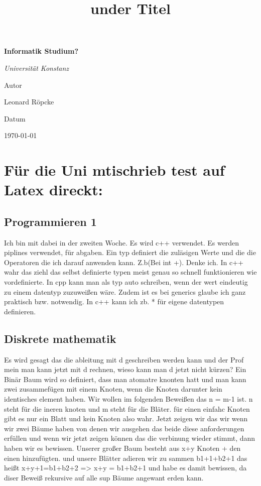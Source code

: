 \documentclass{article}
\title{under Titel}
\newcommand{\AuthorName}{Leonard Röpcke}
\newcommand{\Institute}{}
\newcommand{\header}{Informatik Studium?}
\newcommand{\Subtitle}{Universität Konstanz}
\newcommand{\MyDate}{\today}
\begin{document}
\begin{titlepage}
  \centering
  {\scshape\LARGE \Institute \par}
  \vspace{2.5cm}
  {\huge\bfseries \header \par}
  \vspace{0.8cm}
  {\Large\itshape \Subtitle \par}
  \vfill
  {\Large Autor\par}
  {\Large \AuthorName \par}
  \vspace{1cm}
  {\Large Datum\par}
  {\Large \MyDate \par}
  \vfill
  \vspace{1cm}
  {\small }
\end{titlepage}
\section*{Für die Uni mtischrieb test auf Latex direckt:}
\subsection{Programmieren 1}
Ich bin mit dabei in der zweiten Woche. Es wird c++ verwendet. Es werden piplines verwendet, für abgaben.
Ein typ definiert die zuläsigen Werte und die die Operatoren die ich darauf anwenden kann. Z.b(Bei int +). Denke ich.
In c++ wahr das ziehl das selbst definierte typen meist genau so schnell funktionieren wie vordefinierte.
In cpp kann man als typ auto schreiben, wenn der wert eindeutig zu einem datentyp zuzuweißen wäre. Zudem ist es bei 
generics glaube ich ganz praktisch bzw. notwendig. In c++ kann ich zb. * für eigene datentypen definieren.
\subsection{Diskrete mathematik}
Es wird gesagt das die ableitung mit d geschreiben werden kann und der Prof mein man kann jetzt mit d rechnen, wieso kann man d jetzt nicht kürzen?
Ein Binär Baum wird so definiert, dass man atomatre knonten hatt und man kann zwei zusammefügen mit einem Knoten, wenn die Knoten darunter kein identisches element haben.
Wir wollen im folgenden Beweißen das n = m-1 ist. n steht für die ineren knoten und m steht für die Bläter. für einen einfahc Knoten gibt es nur ein Blatt und kein Knoten also wahr.
Jetzt zeigen wir das wir wenn wir zwei Bäume haben von denen wir ausgehen das beide diese anforderungen erfüllen und wenn wir jetzt zeigen können das die verbinung wieder stimmt,
dann haben wir es bewissen. Unserer großer Baum besteht aus x+y Knoten + den einen hinzufügten. und unsere Blätter adieren wir zu sammen b1+1+b2+1 das heißt x+y+1=b1+b2+2 => x+y = b1+b2+1
und habe es damit bewissen, da diser Beweiß rekursive auf alle sup Bäume angewant erden kann.
\end{document}
